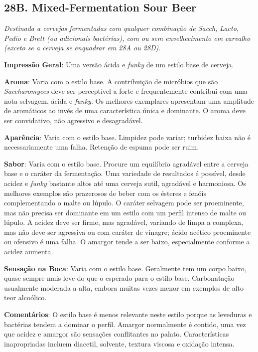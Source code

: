 \subsection*{28B. Mixed-Fermentation Sour Beer}
\textit{Destinada a cervejas fermentadas com qualquer combinação de Sacch, Lacto, Pedio e Brett (ou adicionais bactérias), com ou sem envelhecimento em carvalho (exceto se a cerveja se enquadrar em 28A ou 28D).}

\textbf{Impressão Geral}: Uma versão ácida e \textit{funky} de um estilo base de cerveja.

\textbf{Aroma}: Varia com o estilo base. A contribuição de micróbios que são \textit{Saccharomyces} deve ser perceptível a forte e frequentemente contribui com uma nota selvagem, ácida e \textit{funky}. Os melhores exemplares apresentam uma amplitude de aromáticos ao invés de uma característica única e dominante. O aroma deve ser convidativo, não agressivo e desagradável.

\textbf{Aparência}: Varia com o estilo base. Limpidez pode variar; turbidez baixa não é necessariamente uma falha. Retenção de espuma pode ser ruim.

\textbf{Sabor}: Varia com o estilo base. Procure um equilíbrio agradável entre a cerveja base e o caráter da fermentação. Uma variedade de resultados é possível, desde acidez e \textit{funky} bastante altos até uma cerveja sutil, agradável e harmoniosa. Os melhores exemplos são prazerosos de beber com os ésteres e fenóis complementando o malte ou lúpulo. O caráter selvagem pode ser proeminente, mas não precisa ser dominante em um estilo com um perfil intenso de malte ou lúpulo. A acidez deve ser firme, mas agradável, variando de limpa a complexa, mas não deve ser agressiva ou com caráter de vinagre; ácido acético proeminente ou ofensivo é uma falha. O amargor tende a ser baixo, especialmente conforme a acidez aumenta.

\textbf{Sensação na Boca}: Varia com o estilo base. Geralmente tem um corpo baixo, quase sempre mais leve do que o esperado para o estilo base. Carbonatação usualmente moderada a alta, embora muitas vezes menor em exemplos de alto teor alcoólico.

\textbf{Comentários}: O estilo base é menos relevante neste estilo porque as leveduras e bactérias tendem a dominar o perfil. Amargor normalmente é contido, uma vez que acidez e amargor são sensações conflitantes no palato. Características inapropriadas incluem diacetil, solvente, textura viscosa e oxidação intensa.

